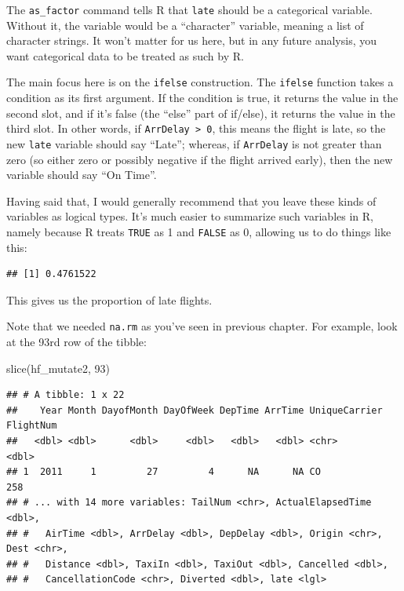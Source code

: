\documentclass[
]{book}
\newenvironment{Shaded}{\begin{snugshade}}{\end{snugshade}}
\newcommand{\AttributeTok}[1]{\textcolor[rgb]{0.77,0.63,0.00}{#1}}
\newcommand{\ConstantTok}[1]{\textcolor[rgb]{0.00,0.00,0.00}{#1}}
\newcommand{\DecValTok}[1]{\textcolor[rgb]{0.00,0.00,0.81}{#1}}
\newcommand{\FunctionTok}[1]{\textcolor[rgb]{0.00,0.00,0.00}{#1}}
\newcommand{\NormalTok}[1]{#1}
\newcommand{\SpecialCharTok}[1]{\textcolor[rgb]{0.00,0.00,0.00}{#1}}
\begin{document}
The \texttt{as\_factor} command tells R that \texttt{late} should be a categorical variable. Without it, the variable would be a ``character'' variable, meaning a list of character strings. It won't matter for us here, but in any future analysis, you want categorical data to be treated as such by R.

The main focus here is on the \texttt{ifelse} construction. The \texttt{ifelse} function takes a condition as its first argument. If the condition is true, it returns the value in the second slot, and if it's false (the ``else'' part of if/else), it returns the value in the third slot. In other words, if \texttt{ArrDelay\ \textgreater{}\ 0}, this means the flight is late, so the new \texttt{late} variable should say ``Late''; whereas, if \texttt{ArrDelay} is not greater than zero (so either zero or possibly negative if the flight arrived early), then the new variable should say ``On Time''.

Having said that, I would generally recommend that you leave these kinds of variables as logical types. It's much easier to summarize such variables in R, namely because R treats \texttt{TRUE} as 1 and \texttt{FALSE} as 0, allowing us to do things like this:

\begin{Shaded}
\end{Shaded}

\begin{verbatim}
## [1] 0.4761522
\end{verbatim}

This gives us the proportion of late flights.

Note that we needed \texttt{na.rm} as you've seen in previous chapter. For example, look at the 93rd row of the tibble:

\begin{Shaded}
\begin{Highlighting}[]
\FunctionTok{slice}\NormalTok{(hf\_mutate2, }\DecValTok{93}\NormalTok{)}
\end{Highlighting}
\end{Shaded}

\begin{verbatim}
## # A tibble: 1 x 22
##    Year Month DayofMonth DayOfWeek DepTime ArrTime UniqueCarrier FlightNum
##   <dbl> <dbl>      <dbl>     <dbl>   <dbl>   <dbl> <chr>             <dbl>
## 1  2011     1         27         4      NA      NA CO                  258
## # ... with 14 more variables: TailNum <chr>, ActualElapsedTime <dbl>,
## #   AirTime <dbl>, ArrDelay <dbl>, DepDelay <dbl>, Origin <chr>, Dest <chr>,
## #   Distance <dbl>, TaxiIn <dbl>, TaxiOut <dbl>, Cancelled <dbl>,
## #   CancellationCode <chr>, Diverted <dbl>, late <lgl>
\end{verbatim}
\end{document}
